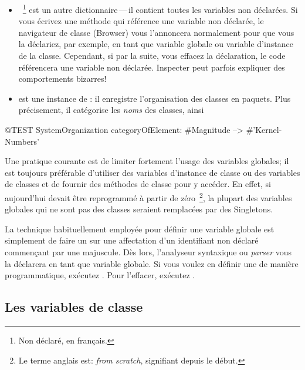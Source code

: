 \documentclass[a4paper,10pt,twoside]{book}
\begin{document}
\begin{itemize}
\item
{}~\footnote{Non déclaré, en français.} est un autre dictionnaire\,---\,il contient toutes les variables non déclarées.
Si vous écrivez une méthode qui référence une variable non déclarée,
le navigateur de classe (Browser) vous l'annoncera normalement
pour que vous la déclariez, par exemple, en tant que variable globale ou variable d'instance de la classe.
Cependant, si par la suite, vous effacez la déclaration, le code référencera une variable non déclarée. 
Inspecter  peut parfois expliquer des comportements bizarres!

\item
{} est une instance de
: il enregistre l'organisation des classes en
paquets.  Plus précisement, il catégorise les \emph{noms} des
classes, ainsi
\end{itemize} %
\begin{code}{@TEST}
SystemOrganization categoryOfElement: #Magnitude --> #'Kernel-Numbers'
\end{code}

Une pratique courante est de limiter fortement l'usage des variables globales;
il est toujours préférable d'utiliser des variables d'instance de classe ou des variables de classes et de fournir des méthodes de classe pour y accéder.
En effet, si aujourd'hui \pharo devait être reprogrammé à partir de
zéro~\footnote{Le terme anglais est: \emph{from scratch}, signifiant depuis le début.}, la plupart des variables globales qui ne sont pas des classes seraient remplacées par des Singletons.

La technique habituellement employée pour définir une variable globale
est simplement de faire un  sur une affectation d'un identifiant
non déclaré commençant par une majuscule. Dès lors,
l'analyseur syntaxique ou \emph{parser} vous 
la déclarera en tant que variable globale.  
Si vous voulez en définir une de manière programmatique, exécutez
.
Pour l'effacer, exécutez .

\subsection{Les variables de classe}
\end{document}
